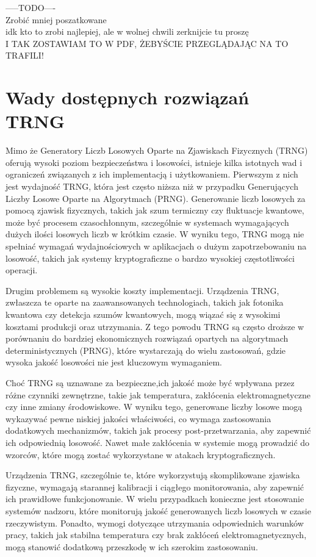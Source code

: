         -----TODO---- \\
    Zrobić mniej poszatkowane \\
    idk kto to zrobi najlepiej, ale w wolnej chwili zerknijcie tu proszę \\
    I TAK ZOSTAWIAM TO W PDF, ŻEBYŚCIE PRZEGLĄDAJĄC NA TO TRAFILI! \\


\section{Wady dostępnych rozwiązań TRNG}

Mimo że Generatory Liczb Losowych Oparte na Zjawiskach Fizycznych (TRNG) oferują wysoki poziom bezpieczeństwa i losowości,
istnieje kilka istotnych wad i ograniczeń związanych z ich implementacją i użytkowaniem. Pierwszym z nich jest 
wydajność TRNG, która jest często niższa niż w przypadku Generujących Liczby Losowe Oparte na Algorytmach (PRNG).
Generowanie liczb losowych za pomocą zjawisk fizycznych, takich jak szum termiczny czy fluktuacje kwantowe,
może być procesem czasochłonnym, szczególnie w systemach wymagających dużych ilości losowych liczb w krótkim czasie.
W wyniku tego, TRNG mogą nie spełniać wymagań wydajnościowych w aplikacjach o dużym zapotrzebowaniu na losowość,
takich jak systemy kryptograficzne o bardzo wysokiej częstotliwości operacji.

Drugim problemem są wysokie koszty implementacji.
Urządzenia TRNG, zwłaszcza te oparte na zaawansowanych technologiach,
takich jak fotonika kwantowa czy detekcja szumów kwantowych,
mogą wiązać się z wysokimi kosztami produkcji oraz utrzymania.
Z tego powodu TRNG są często droższe w porównaniu do bardziej ekonomicznych rozwiązań opartych na algorytmach deterministycznych (PRNG),
które wystarczają do wielu zastosowań, gdzie wysoka jakość losowości nie jest kluczowym wymaganiem.


Choć TRNG są uznawane za bezpieczne,ich jakość może być wpływana przez różne czynniki zewnętrzne, takie jak temperatura,
zakłócenia elektromagnetyczne czy inne zmiany środowiskowe.
W wyniku tego, generowane liczby losowe mogą wykazywać pewne niskiej jakości właściwości,
co wymaga zastosowania dodatkowych mechanizmów, takich jak procesy post-przetwarzania, aby zapewnić ich odpowiednią losowość.
Nawet małe zakłócenia w systemie mogą prowadzić do wzorców, które mogą zostać wykorzystane w atakach kryptograficznych.


Urządzenia TRNG, szczególnie te, które wykorzystują skomplikowane zjawiska fizyczne, wymagają starannej kalibracji i ciągłego monitorowania,
aby zapewnić ich prawidłowe funkcjonowanie. W wielu przypadkach konieczne jest stosowanie systemów nadzoru,
które monitorują jakość generowanych liczb losowych w czasie rzeczywistym.
Ponadto, wymogi dotyczące utrzymania odpowiednich warunków pracy, takich jak stabilna temperatura czy brak zakłóceń elektromagnetycznych,
mogą stanowić dodatkową przeszkodę w ich szerokim zastosowaniu.


